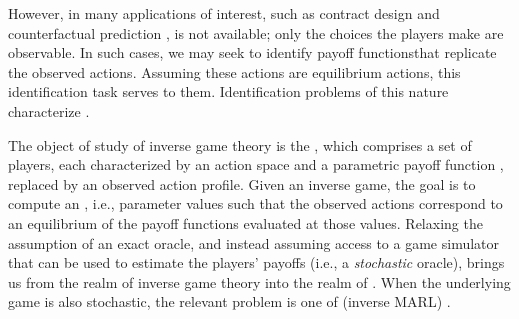 However, in many applications of interest, such as contract design \citep{holmstrom1979moral, grossman1992analysis} and
counterfactual prediction \citep{peysakhovich2019robust}, 
 is not available; only the choices the players make are observable.
In such cases, we may seek to identify payoff functionsthat replicate the observed actions.
Assuming these actions are equilibrium actions, this identification task serves to  them.
Identification problems of this nature characterize  \citep{waugh2013computational, bestick2013inverse}.

The object of study of inverse game theory is the , which comprises a set of players, each characterized by an action space and a parametric payoff function ,
replaced by an observed 
action profile. 
Given an inverse game, the goal is to compute an , i.e., parameter values such that the observed actions correspond to an equilibrium
of the payoff functions evaluated at those values.
%
Relaxing the assumption of an exact oracle, and instead assuming access to a game simulator that can be used to estimate the players' payoffs (i.e., a \emph{stochastic\/} oracle), brings us from the realm of inverse game theory into the realm of .
When the underlying game is also stochastic, the relevant problem is one of  (inverse MARL) \citep{russell1998learning, ng2000algorithms,natarajan2010multi}.

